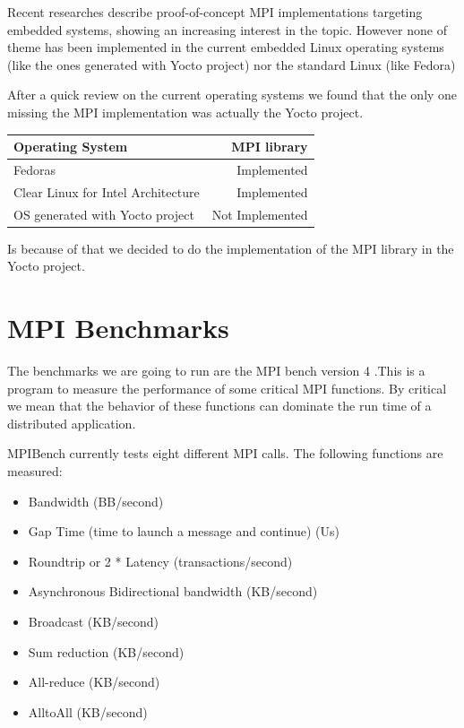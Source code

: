 Recent researches \cite{Saldana} \cite{Gallego} \cite{McMahon} describe
proof-of-concept MPI implementations targeting embedded systems, showing an
increasing interest in the topic. However none of theme has been implemented in
the current embedded Linux operating systems (like the ones generated with
Yocto project\cite{yocto-project}) nor the standard Linux (like
Fedora\cite{fedora})

After a quick review on the current operating systems we found that the only
one missing the MPI implementation was actually the Yocto project.


\begin{center}
\begin{tabular}{ | l | r |}
    \hline
    Operating System & MPI library  \\ \hline
    Fedoras & Implemented  \\ \hline
    Clear Linux for Intel Architecture & Implemented  \\ \hline
    OS generated with Yocto project & Not Implemented  \\ \hline
\end{tabular}
\label{tab:4.2}
\end{center}

Is because of that we decided to do the implementation of the MPI library in
the Yocto project. 

\section{MPI Benchmarks}
\noindent

The benchmarks we are going to run are the MPI bench version 4
\cite{mpibench}.This is a program to measure the performance of some critical
MPI functions. By critical we mean that the behavior of these functions can
dominate the run time of a distributed application.

MPIBench currently tests eight different MPI calls. The following functions are
measured:

\begin{itemize}
    \item Bandwidth (BB/second)
    \item Gap Time (time to launch a message and continue) (Us)
    \item Roundtrip or 2 * Latency (transactions/second)
    \item Asynchronous Bidirectional bandwidth (KB/second)
    \item Broadcast (KB/second)
    \item Sum reduction (KB/second)
    \item All-reduce (KB/second)
    \item AlltoAll (KB/second)
\end{itemize}



